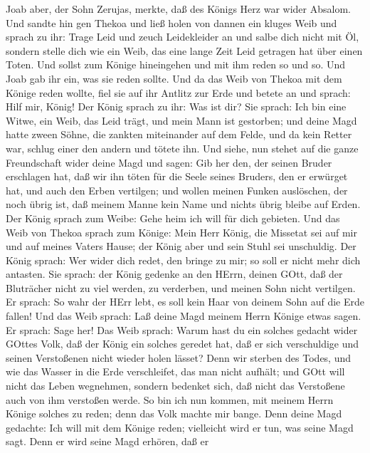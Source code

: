  Joab aber, der Sohn Zerujas, merkte, daß des Königs Herz
war wider Absalom.  Und sandte hin gen Thekoa und ließ holen
von dannen ein kluges Weib und sprach zu ihr: Trage Leid und zeuch
Leidekleider an und salbe dich nicht mit Öl, sondern stelle dich wie ein
Weib, das eine lange Zeit Leid getragen hat über einen Toten.
 Und sollst zum Könige hineingehen und mit ihm reden so und
so. Und Joab gab ihr ein, was sie reden sollte.  Und da das
Weib von Thekoa mit dem Könige reden wollte, fiel sie auf ihr Antlitz
zur Erde und betete an und sprach: Hilf mir, König!  Der
König sprach zu ihr: Was ist dir? Sie sprach: Ich bin eine Witwe, ein
Weib, das Leid trägt, und mein Mann ist gestorben;  und
deine Magd hatte zween Söhne, die zankten miteinander auf dem Felde, und
da kein Retter war, schlug einer den andern und tötete ihn. 
Und siehe, nun stehet auf die ganze Freundschaft wider deine Magd und
sagen: Gib her den, der seinen Bruder erschlagen hat, daß wir ihn töten
für die Seele seines Bruders, den er erwürget hat, und auch den Erben
vertilgen; und wollen meinen Funken auslöschen, der noch übrig ist, daß
meinem Manne kein Name und nichts übrig bleibe auf Erden. 
Der König sprach zum Weibe: Gehe heim ich will für dich gebieten.
 Und das Weib von Thekoa sprach zum Könige: Mein Herr König,
die Missetat sei auf mir und auf meines Vaters Hause; der König aber und
sein Stuhl sei unschuldig.  Der König sprach: Wer wider
dich redet, den bringe zu mir; so soll er nicht mehr dich antasten.
 Sie sprach: der König gedenke an den HErrn, deinen GOtt,
daß der Bluträcher nicht zu viel werden, zu verderben, und meinen Sohn
nicht vertilgen. Er sprach: So wahr der HErr lebt, es soll kein Haar von
deinem Sohn auf die Erde fallen!  Und das Weib sprach: Laß
deine Magd meinem Herrn Könige etwas sagen. Er sprach: Sage her!
 Das Weib sprach: Warum hast du ein solches gedacht wider
GOttes Volk, daß der König ein solches geredet hat, daß er sich
verschuldige und seinen Verstoßenen nicht wieder holen lässet?
 Denn wir sterben des Todes, und wie das Wasser in die Erde
verschleifet, das man nicht aufhält; und GOtt will nicht das Leben
wegnehmen, sondern bedenket sich, daß nicht das Verstoßene auch von ihm
verstoßen werde.  So bin ich nun kommen, mit meinem Herrn
Könige solches zu reden; denn das Volk machte mir bange. Denn deine Magd
gedachte: Ich will mit dem Könige reden; vielleicht wird er tun, was
seine Magd sagt.  Denn er wird seine Magd erhören, daß er

